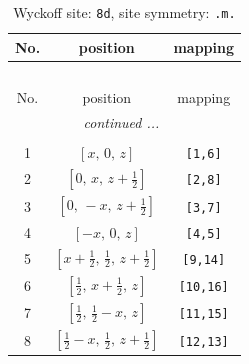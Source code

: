 \documentclass[fleqn,8pt]{jsarticle}
\begin{document}
\begin{longtable}{ccc}
\caption{Wyckoff site: {\tt 8d}, site symmetry: {\tt .m.}}
 \\
 \hline \hline
No. & position & mapping \\ \hline \endfirsthead

\multicolumn{2}{l}{\tablename\ \thetable{}} \\
 \hline \hline
No. & position & mapping \\ \hline \endhead

 \hline \hline
\multicolumn{2}{r}{\footnotesize\it continued ...} \\ \endfoot

 \hline \hline
\multicolumn{2}{r}{} \\ \endlastfoot

1 & $\left[ x,\, 0,\, z \right]$ & {\tt [1,6]} \\ \hline
2 & $\left[ 0,\, x,\, z + \frac{1}{2} \right]$ & {\tt [2,8]} \\ \hline
3 & $\left[ 0,\, - x,\, z + \frac{1}{2} \right]$ & {\tt [3,7]} \\ \hline
4 & $\left[ - x,\, 0,\, z \right]$ & {\tt [4,5]} \\ \hline
5 & $\left[ x + \frac{1}{2},\, \frac{1}{2},\, z + \frac{1}{2} \right]$ & {\tt [9,14]} \\ \hline
6 & $\left[ \frac{1}{2},\, x + \frac{1}{2},\, z \right]$ & {\tt [10,16]} \\ \hline
7 & $\left[ \frac{1}{2},\, \frac{1}{2} - x,\, z \right]$ & {\tt [11,15]} \\ \hline
8 & $\left[ \frac{1}{2} - x,\, \frac{1}{2},\, z + \frac{1}{2} \right]$ & {\tt [12,13]} \\
\end{longtable}
\renewcommand{\arraystretch}{1.2}
\end{document}
